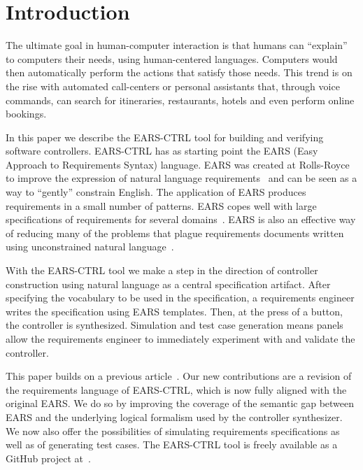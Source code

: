 \section{Introduction}
\vspace{-.2cm}The ultimate goal in human-computer interaction is that humans can
``explain'' to computers their needs, using human-centered languages. Computers
would then automatically perform the actions that satisfy those needs. This
trend is on the rise with automated call-centers or personal
assistants that, through voice commands, can search for itineraries,
restaurants, hotels and even perform online bookings.

In this paper we describe the \textsf{EARS-CTRL} tool for building and verifying
software controllers. \textsf{EARS-CTRL} has as starting point the EARS (Easy
Approach to Requirements Syntax) language. EARS was created at Rolls-Royce to
improve the expression of natural language requirements~\cite{EARS09} and can be
seen as a way to ``gently'' constrain English. The application of EARS produces
requirements in a small number of patterns. EARS copes well with large
specifications of requirements for several domains~\cite{EARS10,EARS16}. EARS is
also an effective way of reducing many of the problems that plague requirements
documents written using unconstrained natural language~\cite{EARS09}.

With the \textsf{EARS-CTRL} tool we make a step in the direction of controller
construction using natural language as a central specification artifact.
After specifying the vocabulary to be used in the specification, a requirements
engineer writes the specification using EARS templates. Then, at the press of a
button, the controller is synthesized. Simulation and test case
generation means panels allow the requirements engineer to immediately
experiment with and validate the controller.

This paper builds on a previous article~\cite{LucioRCM17}.
Our new contributions are a revision of the requirements language of
\textsf{EARS-CTRL}, which is now fully aligned with the original EARS. We do so
by improving the coverage of the semantic gap between EARS and the underlying
logical formalism used by the controller synthesizer. We now also offer the
possibilities of simulating requirements specifications as well as of generating test cases.
The \textsf{EARS-CTRL} tool is freely available as a GitHub project
at~\cite{EARSProject}. \vspace{-.4cm}


